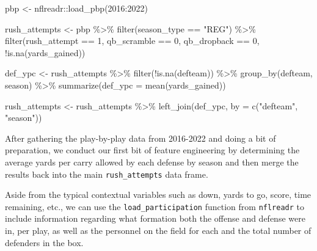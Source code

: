 \documentclass[
  letterpaper,
]{krantz}
\newenvironment{Shaded}{\begin{snugshade}}{\end{snugshade}}
\newcommand{\AttributeTok}[1]{\textcolor[rgb]{0.40,0.45,0.13}{#1}}
\newcommand{\DecValTok}[1]{\textcolor[rgb]{0.68,0.00,0.00}{#1}}
\newcommand{\FunctionTok}[1]{\textcolor[rgb]{0.28,0.35,0.67}{#1}}
\newcommand{\NormalTok}[1]{\textcolor[rgb]{0.00,0.23,0.31}{#1}}
\newcommand{\OtherTok}[1]{\textcolor[rgb]{0.00,0.23,0.31}{#1}}
\newcommand{\SpecialCharTok}[1]{\textcolor[rgb]{0.37,0.37,0.37}{#1}}
\newcommand{\StringTok}[1]{\textcolor[rgb]{0.13,0.47,0.30}{#1}}
\begin{document}
\begin{Shaded}
\begin{Highlighting}[]
\NormalTok{pbp }\OtherTok{\textless{}{-}}\NormalTok{ nflreadr}\SpecialCharTok{::}\FunctionTok{load\_pbp}\NormalTok{(}\DecValTok{2016}\SpecialCharTok{:}\DecValTok{2022}\NormalTok{)}

\NormalTok{rush\_attempts }\OtherTok{\textless{}{-}}\NormalTok{ pbp }\SpecialCharTok{\%\textgreater{}\%}
  \FunctionTok{filter}\NormalTok{(season\_type }\SpecialCharTok{==} \StringTok{"REG"}\NormalTok{) }\SpecialCharTok{\%\textgreater{}\%}
  \FunctionTok{filter}\NormalTok{(rush\_attempt }\SpecialCharTok{==} \DecValTok{1}\NormalTok{, qb\_scramble }\SpecialCharTok{==} \DecValTok{0}\NormalTok{,}
\NormalTok{         qb\_dropback }\SpecialCharTok{==} \DecValTok{0}\NormalTok{, }\SpecialCharTok{!}\FunctionTok{is.na}\NormalTok{(yards\_gained))}

\NormalTok{def\_ypc }\OtherTok{\textless{}{-}}\NormalTok{ rush\_attempts }\SpecialCharTok{\%\textgreater{}\%}
  \FunctionTok{filter}\NormalTok{(}\SpecialCharTok{!}\FunctionTok{is.na}\NormalTok{(defteam)) }\SpecialCharTok{\%\textgreater{}\%}
  \FunctionTok{group\_by}\NormalTok{(defteam, season) }\SpecialCharTok{\%\textgreater{}\%}
  \FunctionTok{summarize}\NormalTok{(}\AttributeTok{def\_ypc =} \FunctionTok{mean}\NormalTok{(yards\_gained))}

\NormalTok{rush\_attempts }\OtherTok{\textless{}{-}}\NormalTok{ rush\_attempts }\SpecialCharTok{\%\textgreater{}\%}
  \FunctionTok{left\_join}\NormalTok{(def\_ypc, }\AttributeTok{by =} \FunctionTok{c}\NormalTok{(}\StringTok{"defteam"}\NormalTok{, }\StringTok{"season"}\NormalTok{))}
\end{Highlighting}
\end{Shaded}

After gathering the play-by-play data from 2016-2022 and doing a bit of
preparation, we conduct our first bit of feature engineering by
determining the average yards per carry allowed by each defense by
season and then merge the results back into the main
\texttt{rush\_attempts} data frame.

Aside from the typical contextual variables such as down, yards to go,
score, time remaining, etc., we can use the \texttt{load\_participation}
function from \texttt{nflreadr} to include information regarding what
formation both the offense and defense were in, per play, as well as the
personnel on the field for each and the total number of defenders in the
box.
\end{document}
